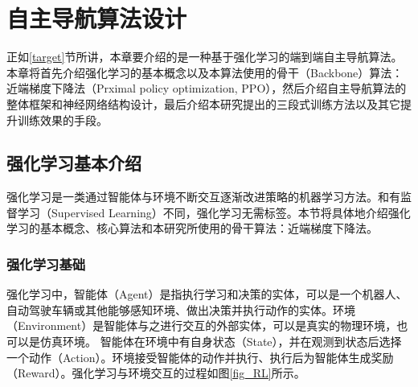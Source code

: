 
\chapter{自主导航算法设计}

正如\ref{target}节所讲，本章要介绍的是一种基于强化学习的端到端自主导航算法。本章将首先介绍强化学习的基本概念以及本算法使用的骨干（Backbone）算法：近端梯度下降法（Prximal policy optimization, PPO），然后介绍自主导航算法的整体框架和神经网络结构设计，最后介绍本研究提出的三段式训练方法以及其它提升训练效果的手段。

\section{强化学习基本介绍}
强化学习是一类通过智能体与环境不断交互逐渐改进策略的机器学习方法。和有监督学习（Supervised Learning）不同，强化学习无需标签。本节将具体地介绍强化学习的基本概念、核心算法和本研究所使用的骨干算法：近端梯度下降法。

\subsection{强化学习基础}
强化学习中，智能体（Agent）是指执行学习和决策的实体，可以是一个机器人、自动驾驶车辆或其他能够感知环境、做出决策并执行动作的实体。环境（Environment）是智能体与之进行交互的外部实体，可以是真实的物理环境，也可以是仿真环境。
智能体在环境中有自身状态（State），并在观测到状态后选择一个动作（Action）。环境接受智能体的动作并执行、执行后为智能体生成奖励（Reward）。强化学习与环境交互的过程如图\ref{fig_RL}所示。


